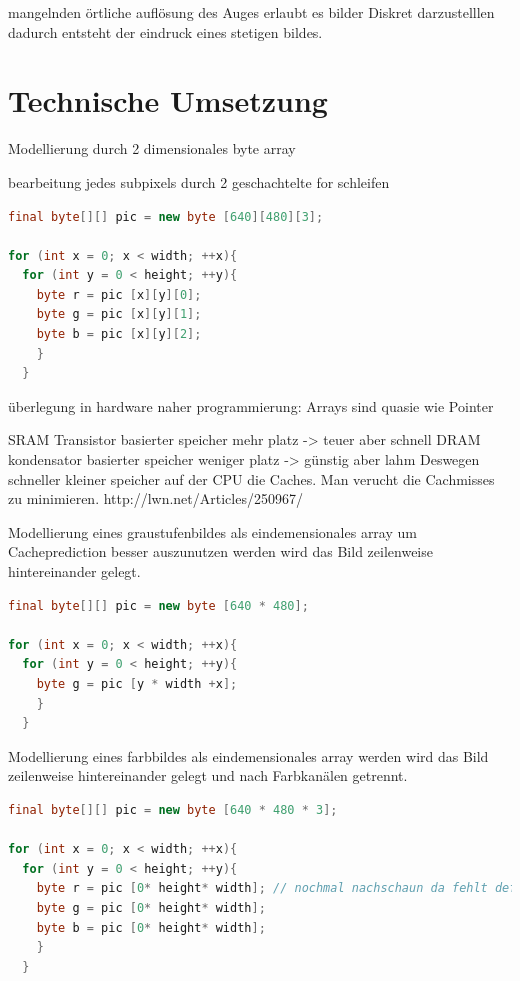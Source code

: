\documentclass[tog]{acmsiggraph}
\begin{document}
mangelnden örtliche auflösung des Auges erlaubt es bilder Diskret darzustelllen dadurch entsteht der eindruck eines stetigen bildes.

\section{Technische Umsetzung}
Modellierung durch 2 dimensionales byte array

bearbeitung jedes subpixels durch 2 geschachtelte for schleifen

\begin{lstlisting}[language=Java]
final byte[][] pic = new byte [640][480][3];

for (int x = 0; x < width; ++x){
  for (int y = 0 < height; ++y){
    byte r = pic [x][y][0];
    byte g = pic [x][y][1];
    byte b = pic [x][y][2];
    }
  }
\end{lstlisting}

überlegung in hardware naher programmierung: Arrays sind quasie wie Pointer

SRAM Transistor basierter speicher mehr platz -> teuer aber schnell
DRAM kondensator basierter speicher weniger platz -> günstig aber lahm
Deswegen schneller kleiner speicher auf der CPU die Caches.
Man verucht die Cachmisses zu minimieren.
http://lwn.net/Articles/250967/

Modellierung eines graustufenbildes als eindemensionales array um Cacheprediction besser auszunutzen
werden wird das Bild zeilenweise hintereinander gelegt.

\begin{lstlisting}[language=Java]
final byte[][] pic = new byte [640 * 480];

for (int x = 0; x < width; ++x){
  for (int y = 0 < height; ++y){
    byte g = pic [y * width +x];
    }
  }
\end{lstlisting}

Modellierung eines farbbildes als eindemensionales array
werden wird das Bild zeilenweise hintereinander gelegt und nach Farbkanälen getrennt. 

\begin{lstlisting}[language=Java]
final byte[][] pic = new byte [640 * 480 * 3];

for (int x = 0; x < width; ++x){
  for (int y = 0 < height; ++y){
    byte r = pic [0* height* width]; // nochmal nachschaun da fehlt definifv noch was :P
    byte g = pic [0* height* width];
    byte b = pic [0* height* width];
    }
  }
\end{lstlisting}
\end{document}
